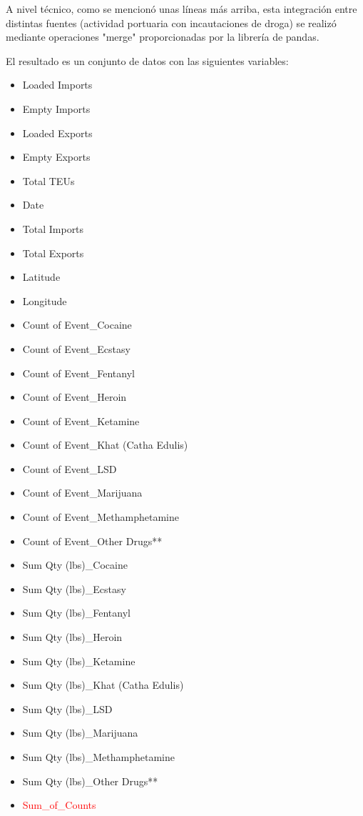 \documentclass[12pt]{article}
\begin{document}
		A nivel técnico, como se mencionó unas líneas más arriba, esta integración entre distintas fuentes (actividad portuaria con incautaciones de droga) se realizó mediante operaciones "merge" proporcionadas por la librería de pandas.
		
		El resultado es un conjunto de datos con las siguientes variables:
		
		\begin{itemize}
			\item Loaded Imports
			\item Empty Imports
			\item Loaded Exports
			\item Empty Exports
			\item Total TEUs
			\item Date
			\item Total Imports
			\item Total Exports
			\item Latitude
			\item Longitude
			\item Count of Event\_Cocaine
			\item Count of Event\_Ecstasy
			\item Count of Event\_Fentanyl
			\item Count of Event\_Heroin
			\item Count of Event\_Ketamine
			\item Count of Event\_Khat (Catha Edulis)
			\item Count of Event\_LSD
			\item Count of Event\_Marijuana
			\item Count of Event\_Methamphetamine
			\item Count of Event\_Other Drugs**
			\item Sum Qty (lbs)\_Cocaine
			\item Sum Qty (lbs)\_Ecstasy
			\item Sum Qty (lbs)\_Fentanyl
			\item Sum Qty (lbs)\_Heroin
			\item Sum Qty (lbs)\_Ketamine
			\item Sum Qty (lbs)\_Khat (Catha Edulis)
			\item Sum Qty (lbs)\_LSD
			\item Sum Qty (lbs)\_Marijuana
			\item Sum Qty (lbs)\_Methamphetamine
			\item Sum Qty (lbs)\_Other Drugs**
			\item \textcolor{red}{Sum\_of\_Counts}
		\end{itemize}
	
\end{document}

